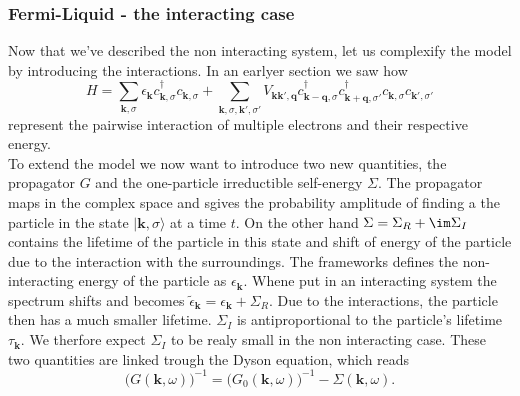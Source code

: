 \documentclass[../main.tex]{subfile}
\begin{document}
\subsubsection{Fermi-Liquid - the interacting case}
Now that we've described the non interacting system, let us complexify the model by introducing the interactions.
In an earlyer section we saw how
\begin{equation} \label{eq:FermiLiquid_Hamiltonian}
    H = \sum_{\bm{k},\sigma} \epsilon_{\bm{k}} c_{\bm{k},\sigma}^{\dagger}c_{\bm{k},\sigma} + \sum_{\bm{k},\sigma,\bm{k}',\sigma'}
        V_{\bm{k}\bm{k}', \bm{q}} c_{\bm{k}-\bm{q},\sigma}^{\dagger}c_{\bm{k}+\bm{q},\sigma'}^{\dagger}c_{\bm{k},\sigma}c_{\bm{k}',\sigma'}
\end{equation}
represent the pairwise interaction of multiple electrons and their respective energy.\\

To extend the model we now want to introduce two new quantities,
the propagator $G$ and the one-particle irreductible self-energy $\Sigma$.
The propagator maps in the complex space and sgives the probability amplitude of finding a the particle in the state $|\bm{k},\sigma\rangle$ at a time $t$. On the other hand 
$\Sigma = \Sigma_R + \im \Sigma_I$ contains 
the lifetime of the particle in this state and shift of energy of the particle due to the interaction with the surroundings. The frameworks defines the 
non-interacting energy of the particle as $\epsilon_{\bm{k}}$. Whene put in an interacting system the spectrum shifts and becomes 
$\tilde{\epsilon}_{\bm{k}} =  \epsilon_{\bm{k}} + \Sigma_R$. Due to the interactions, the particle then has a much smaller lifetime. $\Sigma_I$ is antiproportional to 
the particle's lifetime $\tau_{\bm{k}}$. We therfore expect $\Sigma_I$ to be realy small in the non interacting case. 
These two quantities are linked trough the Dyson equation, which reads
\[
    \bigl(G(\bm{k}, \omega)\bigr)^{-1} =  \bigl(G_0(\bm{k}, \omega)\bigr)^{-1} - \Sigma(\bm{k},\omega).
\]
\end{document}
